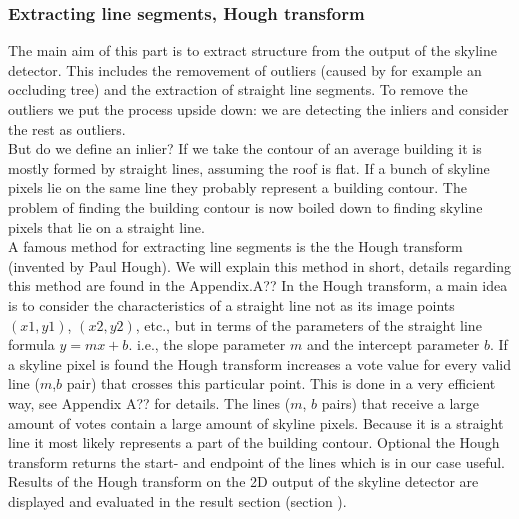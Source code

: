 \documentclass[10pt]{article}
\begin{document}
\subsubsection{Extracting line segments, Hough transform} %

	The main aim of this part is to extract structure from the output of the skyline detector. This includes the removement of outliers (caused by for example an occluding tree) and the extraction of straight line segments. 
	To remove the outliers we put the process upside down: we are detecting the inliers and consider the rest as outliers.\\
	But do we define an inlier? If we take the contour of an average building it is mostly formed by straight lines, assuming the roof is flat.
	If a bunch of skyline pixels lie on the same line they probably represent a building contour.
	The problem of finding the building contour is now boiled down to finding skyline pixels that lie on a straight line.
	\\
	A famous method for extracting line segments is the the Hough transform (invented by Paul Hough).
	We will explain this method in short, details regarding this method are found in the Appendix.A??%
	In the Hough transform, a main idea is to consider the characteristics of a straight line not as its image points $(x1, y1)$, $(x2, y2)$, etc., but in terms of the parameters of the straight line formula $y = mx + b$. i.e., the slope parameter $m$ and the intercept parameter $b$.
	If a skyline pixel is found the Hough transform increases a vote value for every valid line ($m$,$b$ pair) that crosses this particular point. This is done in a very efficient way, see Appendix A?? %
	for details.
	The lines ($m$, $b$ pairs) that receive a large amount of votes contain a large amount of skyline pixels. Because it is a straight line it most likely represents a part of the building contour. 
	Optional the Hough transform returns the start- and endpoint of the lines which is in our case useful. 
	\\
	Results of the Hough transform on the 2D output of the skyline detector are displayed and evaluated in the result section (section %
	).
\end{document}
